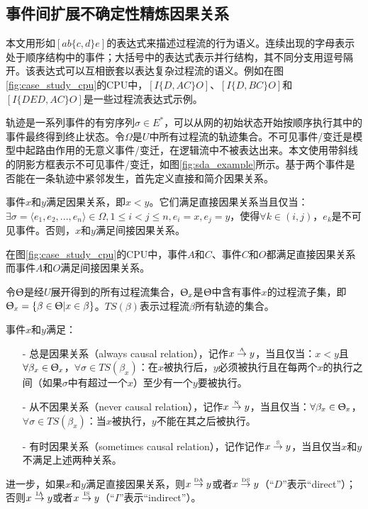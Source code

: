 \subsection{事件间扩展不确定性精炼因果关系}\label{subsec:exroru_event_causal}
本文用形如$[ab\{c,d\}e]$的表达式来描述过程流的行为语义。连续出现的字母表示处于顺序结构中的事件；大括号中的表达式表示并行结构，其不同分支用逗号隔开。该表达式可以互相嵌套以表达复杂过程流的语义。例如在图\ref{fig:case_study_cpu}的CPU中，$[I\{D,AC\}O]$、$[I\{D,BC\}O]$和$[I\{DED,AC\}O]$是一些过程流表达式示例。

轨迹是一系列事件的有穷序列$\sigma\in E^{*}$，可以从网的初始状态开始按顺序执行其中的事件最终得到终止状态。令$\Omega$是$U$中所有过程流的轨迹集合。不可见事件/变迁是模型中起路由作用的无意义事件/变迁，在逻辑流中不被表达出来\cite{wen2007mining}。本文使用带斜线的阴影方框表示不可见事件/变迁，如图\ref{fig:sda_example}所示。基于两个事件是否能在一条轨迹中紧邻发生，首先定义直接和简介因果关系。

\begin{definition}[直接和间接因果关系]\label{def:exroru_event_causal_direct}
事件$x$和$y$满足因果关系，即$x<y$。它们满足直接因果关系当且仅当：$\exists\sigma=\langle e_{1},e_{2},...,e_{n}\rangle\in\Omega,1\leq i<j\leq n,e_{i}=x,e_{j}=y$，使得$\forall k\in(i,j)$，$e_{k}$是不可见事件。否则，$x$和$y$满足间接因果关系。
\end{definition}

\begin{example}\label{ex:sda}
在图\ref{fig:case_study_cpu}的CPU中，事件$A$和$C$、事件$C$和$O$都满足直接因果关系而事件$A$和$O$满足间接因果关系。
\end{example}

令$\Uptheta$是经$U$展开得到的所有过程流集合，$\Uptheta_{x}$是$\Uptheta$中含有事件$x$的过程流子集，即$\Uptheta_{x}=\{\beta\in\Uptheta|x\in\beta\}$。$TS(\beta)$表示过程流$\beta$所有轨迹的集合。

\begin{definition}[事件间扩展不确定性精炼因果关系]\label{def:exroru_event_causal}
事件$x$和$y$满足：
  \begin{itemize}
  	\item[-] 总是因果关系（always causal relation），记作$x\overset{\text{\tiny{A}}}{\rightarrow}y$，当且仅当：$x<y$且$\forall\beta_{x}\in\Uptheta_{x}$，$\forall\sigma\in TS(\beta_{x})$：在$x$被执行后，$y$必须被执行且在每两个$x$的执行之间（如果$\sigma$中有超过一个$x$）至少有一个$y$要被执行。
  	\item[-] 从不因果关系（never causal relation），记作$x\overset{\text{\tiny{N}}}{\rightarrow}y$，当且仅当：$\forall\beta_{x}\in\Uptheta_{x}$，$\forall\sigma\in TS(\beta_{x})$：当$x$被执行，$y$不能在其之后被执行。
  	\item[-] 有时因果关系（sometimes causal relation），记作记作$x\overset{\text{\tiny{S}}}{\rightarrow}y$，当且仅当$x$和$y$不满足上述两种关系。
  \end{itemize}
进一步，如果$x$和$y$满足直接因果关系，则$x\overset{\text{\tiny{DA}}}{\rightarrow}y$或者$x\overset{\text{\tiny{DS}}}{\rightarrow}y$（“$D$”表示“direct”）；否则$x\overset{\text{\tiny{IA}}}{\rightarrow}y$或者$x\overset{\text{\tiny{IS}}}{\rightarrow}y$（“$I$”表示“indirect”）。
\end{definition}

